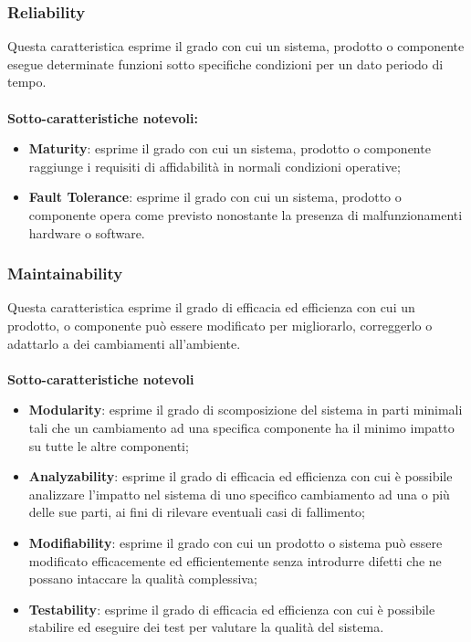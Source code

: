 \subsubsection{Reliability}
Questa caratteristica esprime il grado con cui un sistema, prodotto o componente esegue determinate funzioni sotto specifiche condizioni per un dato periodo di tempo. \\ \\
\textbf{Sotto-caratteristiche notevoli:}
\begin{itemize}
	\item{\textbf{Maturity}}: esprime il grado con cui un sistema, prodotto o componente raggiunge i requisiti di affidabilità in normali condizioni operative;
	\item{\textbf{Fault Tolerance}}: esprime il grado con cui un sistema, prodotto o componente opera come previsto nonostante la presenza di malfunzionamenti hardware o software.
\end{itemize}

\subsubsection{Maintainability}
Questa caratteristica esprime il grado di efficacia ed efficienza con cui un prodotto, o componente può essere modificato per migliorarlo, correggerlo o adattarlo a dei cambiamenti all'ambiente. \\ \\
\textbf{Sotto-caratteristiche notevoli}
\begin{itemize}
	\item{\textbf{Modularity}}: esprime il grado di scomposizione del sistema in parti minimali tali che un cambiamento ad una specifica componente ha il minimo impatto su tutte le altre componenti;
	\item{\textbf{Analyzability}}: esprime il grado di efficacia ed efficienza con cui è possibile analizzare l'impatto nel sistema di uno specifico cambiamento ad una o più delle sue parti, ai fini di rilevare eventuali casi di fallimento;
	\item{\textbf{Modifiability}}: esprime il grado con cui un prodotto o sistema può essere modificato efficacemente ed efficientemente senza introdurre difetti che ne possano intaccare la qualità complessiva;
	\item{\textbf{Testability}}: esprime il grado di efficacia ed efficienza con cui è possibile stabilire ed eseguire dei test per valutare la qualità del sistema.
\end{itemize}


